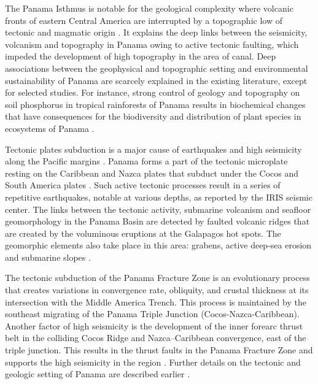 \documentclass[USenglish,twocolumn]{article}
\begin{document}
The Panama Isthmus is notable for the geological complexity where volcanic fronts of eastern Central America are interrupted by a topographic low of tectonic and magmatic origin \cite{Buchs}. It explains the deep links between the seismicity, volcanism and topography in Panama owing to active tectonic faulting, which impeded the development of high topography in the area of canal. Deep associations between the geophysical and topographic setting and environmental sustainability of Panama are scarcely explained in the existing literature, except for selected studies. For instance, strong control of geology and topography on soil phosphorus in tropical rainforests of Panama results in biochemical changes that have consequences for the biodiversity and distribution of plant species in ecosystems of Panama \cite{Dieter}. 

Tectonic plates subduction is a major cause of earthquakes and high seismicity along the Pacific margins \cite{Lemenkova202032,Lemenkova2019107}. Panama forms a part of the tectonic microplate resting on the Caribbean and Nazca plates that subduct under the Cocos and South America plates \cite{Demets,Bergoeing}. Such active tectonic processes result in a series of repetitive earthquakes, notable at various depths, as reported by the IRIS seismic center. The links between the tectonic activity, submarine volcanism and seafloor geomorphology in the Panama Basin are detected by faulted volcanic ridges that are created by the voluminous eruptions at the Galapagos hot spots. The geomorphic elements also take place in this area: grabens, active deep-sea erosion and submarine slopes \cite{Lonsdale}. 

The tectonic subduction of the Panama Fracture Zone is an evolutionary process that creates variations in convergence rate, obliquity, and crustal thickness at its intersection with the Middle America Trench. This process is maintained by the southeast migrating of the Panama Triple Junction (Cocos-Nazca-Caribbean). Another factor of high seismicity is the development of the inner forearc thrust belt in the colliding Cocos Ridge and Nazca–Caribbean convergence, east of the triple junction. This results in the thrust faults in the Panama Fracture Zone and supports the high seismicity in the region \cite{Morell}. Further details on the tectonic and geologic setting of Panama are described earlier \cite{Wolters,Vergara,Cardona,Fuchs,Hardy}. 
\end{document}
